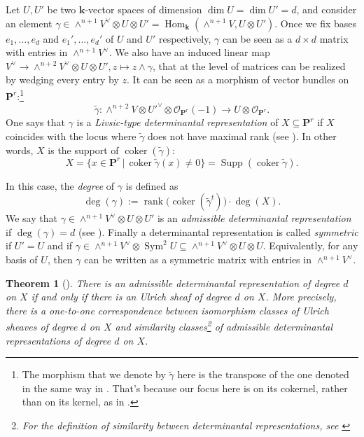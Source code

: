 \documentclass[12pt]{amsart}
\newcounter{thmcounter}
\numberwithin{equation}{section}
\numberwithin{thmcounter}{section}
\newtheorem{theorem}[thmcounter]{Theorem}
\theoremstyle{definition}
\theoremstyle{claim}
\newcommand{\kk}{\mathbf{k}}
\newcommand{\nP}{\mathbf{P}}
\newcommand{\sO}{\mathscr{O}}
\DeclareMathOperator{\coker}{coker}
\DeclareMathOperator{\rank}{rank}
\begin{document}
Let $U,U'$ be two $\kk$-vector spaces of dimension $\dim U = \dim U' = d$, and consider an element $\gamma \in \wedge^{n+1}V^{\vee}\otimes U\otimes U' = \operatorname{Hom}_{\kk}(\wedge^{n+1}V,U\otimes U')$. Once we fix bases $e_1,\dots,e_d$ and $e_1',\dots,e_d'$ of $U$ and $U'$ respectively, $\gamma$ can be seen as a $d \times d$ matrix with entries in $\wedge^{n+1}V^{\vee}$. We also have an induced linear map $V^{\vee} \rightarrow \wedge^{n+2}V^{\vee} \otimes U \otimes U',  z\mapsto z\wedge \gamma$, that at the level of matrices can be realized by wedging every entry by $z$. It can be seen as a morphism  of vector bundles on $\mathbf{P}^r$:\footnote{The morphism that we denote by $\widetilde{\gamma}$ here is the transpose of the one denoted in the same way in \cite{kummershamovich}. That's because our focus here is on its cokernel, rather than on its kernel, as in \cite{kummershamovich}.} 
\[  \widetilde{\gamma}\colon \wedge^{n+2}V \otimes U'^{\vee} \otimes \sO_{\nP^r}(-1) \longrightarrow U\otimes \sO_{\nP^r}.  \]
One says that $\gamma$ is a \emph{Livsic-type determinantal representation} of $X \subseteq \nP^r$ if $X$ coincides with the locus where $\widetilde{\gamma}$ does not have maximal rank (see \cite[Definition 4.2]{kummershamovich}). In other words, $X$ is the support of $\operatorname{coker}(\widetilde{\gamma})$:
\[ X = \{ x \in \nP^r \,|\, \operatorname{coker} \widetilde{\gamma}(x) \ne 0 \} = \operatorname{Supp}(\operatorname{coker} \widetilde{\gamma} ).  \]

In this case, the \emph{degree} of $\gamma$ is defined as
$$
\deg (\gamma):=
\rank \big( \coker(\widetilde{\gamma}^t) \big) \cdot \deg(X).
$$
We say that $\gamma \in \wedge^{n+1} V^{\vee} \otimes U\otimes U'$ is an \emph{admissible determinantal representation} if $\deg(\gamma) = d$ (see \cite[Definition 4.3]{kummershamovich}).
Finally a determinantal representation is called \emph{symmetric} if $U'=U$ and if $\gamma \in \wedge^{n+1}V^{\vee}\otimes \operatorname{Sym}^2 U \subseteq \wedge^{n+1}V^{\vee}\otimes U\otimes U$. Equivalently, for any basis of $U$, then $\gamma$ can be written as a symmetric matrix with entries in $\wedge^{n+1}V^{\vee}$.


\begin{theorem}[{\cite[Theorem 4.7 and Proposition 4.11]{kummershamovich}}]\label{thm:detrep<=>ulrich}
There is an admissible determinantal representation of degree $d$ on $X$ if and only if there is an Ulrich sheaf of degree $d$ on $X$. More precisely, there is a one-to-one correspondence between isomorphism classes of Ulrich sheaves of degree $d$ on $X$  and similarity classes\footnote{For the definition of similarity between determinantal representations, see \cite[before Proposition 4.11]{kummershamovich}} of  admissible determinantal representations of degree $d$ on $X$.
\end{theorem}
\end{document}
